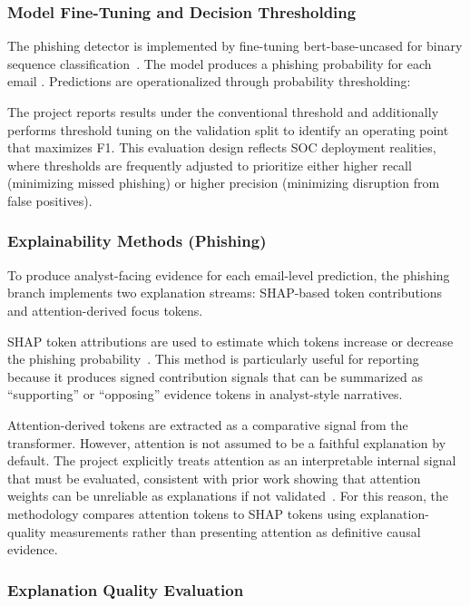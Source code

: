 \documentclass[conference]{IEEEtran}
\begin{document}
\subsubsection{Model Fine-Tuning and Decision Thresholding}

The phishing detector is implemented by fine-tuning bert-base-uncased for binary sequence classification~\cite{JMKK2019}. The model produces a phishing probability for each email . Predictions are operationalized through probability thresholding:

The project reports results under the conventional threshold and additionally performs threshold tuning on the validation split to identify an operating point that maximizes F1. This evaluation design reflects SOC deployment realities, where thresholds are frequently adjusted to prioritize either higher recall (minimizing missed phishing) or higher precision (minimizing disruption from false positives).

\subsubsection{Explainability Methods (Phishing)}

To produce analyst-facing evidence for each email-level prediction, the phishing branch implements two explanation streams: SHAP-based token contributions and attention-derived focus tokens.

SHAP token attributions are used to estimate which tokens increase or decrease the phishing probability~\cite{LL2017}. This method is particularly useful for reporting because it produces signed contribution signals that can be summarized as “supporting” or “opposing” evidence tokens in analyst-style narratives.

Attention-derived tokens are extracted as a comparative signal from the transformer. However, attention is not assumed to be a faithful explanation by default. The project explicitly treats attention as an interpretable internal signal that must be evaluated, consistent with prior work showing that attention weights can be unreliable as explanations if not validated~\cite{JW2019}. For this reason, the methodology compares attention tokens to SHAP tokens using explanation-quality measurements rather than presenting attention as definitive causal evidence.

\subsubsection{Explanation Quality Evaluation}
\end{document}
